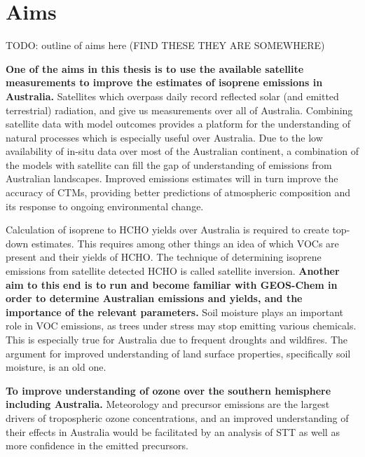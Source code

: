 \section{Aims}
\label{LR:Aims}
TODO: outline of aims here (FIND THESE THEY ARE SOMEWHERE)
  
  \textbf{One of the aims in this thesis is to use the available satellite measurements to improve the estimates of isoprene emissions in Australia.}
  Satellites which overpass daily record reflected solar (and emitted terrestrial) radiation, and give us measurements over all of Australia.
  Combining satellite data with model outcomes provides a platform for the understanding of natural processes which is especially useful over Australia.
  Due to the low availability of in-situ data over most of the Australian continent, a combination of the models with satellite can fill the gap of understanding of emissions from Australian landscapes.
  Improved emissions estimates will in turn improve the accuracy of CTMs, providing better predictions of atmospheric composition and its response to ongoing environmental change.
  
  Calculation of isoprene to HCHO yields over Australia is required to create top-down estimates.
  This requires among other things an idea of which VOCs are present and their yields of HCHO.
  The technique of determining isoprene emissions from satellite detected HCHO is called satellite inversion.
  \textbf{Another aim to this end is to run and become familiar with GEOS-Chem in order to determine Australian emissions and yields, and the importance of the relevant parameters.}
  Soil moisture plays an important role in VOC emissions, as trees under stress may stop emitting various chemicals. 
  This is especially true for Australia due to frequent droughts and wildfires.
  The argument for improved understanding of land surface properties, specifically soil moisture, is an old one\parencite{Mintz1982, Rowntree1983, Chen2001}.
  
  \textbf{To improve understanding of ozone over the southern hemisphere including Australia.}
  Meteorology and precursor emissions are the largest drivers of tropospheric ozone concentrations, and an improved understanding of their effects in Australia would be facilitated by an analysis of STT as well as more confidence in the emitted precursors.
  
